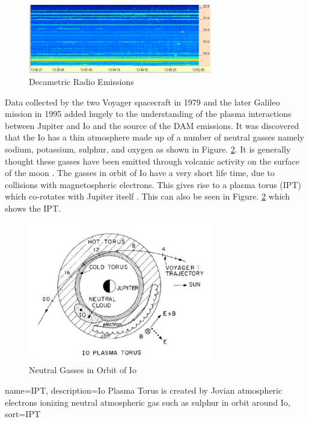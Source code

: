 \documentclass[runningheads,a4paper]{llncs}
\begin{document}
%
\begin{figure}[here]
\centering
\includegraphics[width=8cm]{images/01}
\caption{Decametric Radio Emissions \citep{ashcraft13}}
\label{fig:dam_Emissions}
\end{figure}
%

Data collected by the two Voyager spacecraft in 1979 \citep{belcher87} and the later Galileo mission in 1995 \citep{kivelson96} added hugely to the understanding of the plasma interactions between Jupiter and Io and the source of the \gls{DAM} emissions. It was discovered that the Io has a thin atmosphere made up of a number of neutral gasses namely sodium, potassium, sulphur, and oxygen as shown in Figure. \ref{fig:io_neutral_gasses}. It is generally thought these gasses have been emitted through volcanic activity on the surface of the moon \citep{belcher87}. The gasses in orbit of Io have a very short life time, due to collisions with magnetospheric electrons. This gives rise to a plasma torus (\gls{IPT}) which co-rotates with Jupiter itself \citep{belcher87}. This can also be seen in Figure. \ref{fig:io_neutral_gasses} which shows the \gls{IPT}.

%
\begin{figure}[here]
\centering
\includegraphics[width=8cm]{images/02}
\caption{Neutral Gasses in Orbit of Io \citep{belcher87}}
\label{fig:io_neutral_gasses}
\end{figure}
%

%
{
  name={IPT},
  description={Io Plasma Torus is created by Jovian atmospheric electrons ionizing neutral atmospheric gas such as sulphur in orbit around Io},
  sort=IPT
}
%
\end{document}
